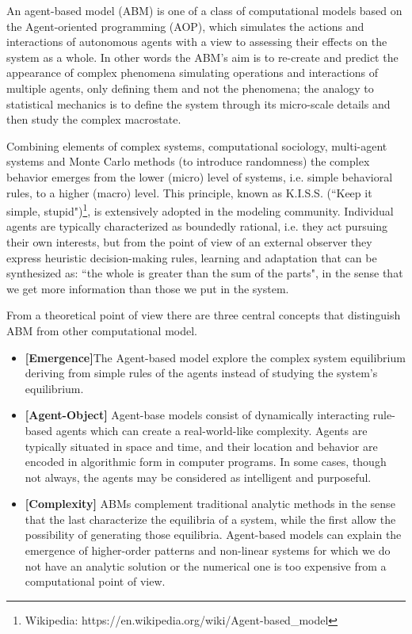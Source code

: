 \documentclass[11pt,a4paper]{article}
\begin{document}
An agent-based model (ABM) is one of a class of computational models based on the Agent-oriented programming (AOP), which simulates the actions and interactions of autonomous agents with a view to assessing their effects on the system as a whole. 
In other words the ABM's aim is to re-create and predict the appearance of complex phenomena simulating operations and interactions of multiple agents, only defining them and not the phenomena; the analogy to statistical mechanics is to define the system through its micro-scale details and then study the complex macrostate. 

Combining elements of complex systems, computational sociology, multi-agent systems and Monte Carlo methods (to introduce randomness) the complex behavior emerges from the lower (micro) level of systems, i.e. simple behavioral rules, to a higher (macro) level. 
This principle, known as K.I.S.S. (“Keep it simple, stupid")\footnote{Wikipedia: https://en.wikipedia.org/wiki/Agent-based\_model}, is extensively adopted in the modeling community. Individual agents are typically characterized as boundedly rational, i.e. they act pursuing their own interests, but from the point of view of an external observer they express heuristic decision-making rules, learning and adaptation that can be synthesized as: “the whole is greater than the sum of the parts", in the sense that we get more information than those we put in the system.

From a theoretical point of view there are three central concepts that distinguish ABM from other computational model. 
\begin{itemize}
\item \textbf{[Emergence]}The Agent-based model explore the complex system equilibrium deriving from simple rules of the agents instead of studying the system's equilibrium.
\item \textbf{[Agent-Object]} Agent-base models consist of dynamically interacting rule-based agents which can create a real-world-like complexity. 
Agents are typically situated in space and time, and their location and behavior are encoded in algorithmic form in computer programs. 
In some cases, though not always, the agents may be considered as intelligent and purposeful.
\item \textbf{[Complexity]} ABMs complement traditional analytic methods in the sense that the last characterize the equilibria of a system, while the first  allow the possibility of generating those equilibria. 
Agent-based models can explain the emergence of higher-order patterns and non-linear systems for which we do not have an analytic solution or the numerical one is too expensive from a computational point of view.
\end{itemize}
\end{document}
